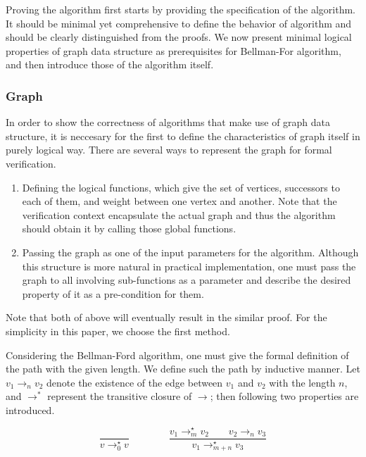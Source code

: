 \documentclass[a4paper,12pt]{article}
\newcommand{\edgen}[3]{#1\rightarrow_{#3}#2}
\newcommand{\pathn}[3]{#1\rightarrow^\star_{#3}#2}
\begin{document}
Proving the algorithm first starts by providing the specification of
the algorithm. It should be minimal yet comprehensive to define the
behavior of algorithm and should be clearly distinguished from the
proofs. We now present minimal logical properties of graph data
structure as prerequisites for Bellman-For algorithm, and then
introduce those of the algorithm itself. 
 
\subsubsection{Graph}

In order to show the correctness of algorithms that make use of graph
data structure, it is neccesary for the first to define the
characteristics of graph itself in purely logical way. There are
several ways to represent the graph for formal verification.

\begin{enumerate}

\item Defining the logical functions, which give the set of vertices,
  successors to each of them, and weight between one vertex and
  another. Note that the verification context encapsulate the actual
  graph and thus the algorithm should obtain it by calling those
  global functions.

\item Passing the graph as one of the input parameters for the
  algorithm. Although this structure is more natural in practical
  implementation, one must pass the graph to all involving
  sub-functions as a parameter and describe the desired property of it
  as a pre-condition for them.

\end{enumerate}

Note that both of above will eventually result in the similar
proof. For the simplicity in this paper, we choose the first method.

Considering the Bellman-Ford algorithm, one must give the formal
definition of the path with the given length. We define such the path
by inductive manner. Let $\edgen{v_1}{v_2}{n}$ denote the
existence of the edge between $ v_1 $ and $ v_2 $ with the length $ n
$, and $ \to ^* $ represent the transitive closure of $ \to $; then
following two properties are introduced.

\begin{displaymath}
  \frac{}
       {\pathn{v}{v}{0}}
  \qquad\qquad
  \frac{\pathn{v_1}{v_2}{m} \qquad \edgen{v_2}{v_3}{n}}
       {\pathn{v_1}{v_3}{m+n}}
\end{displaymath}
\end{document}
